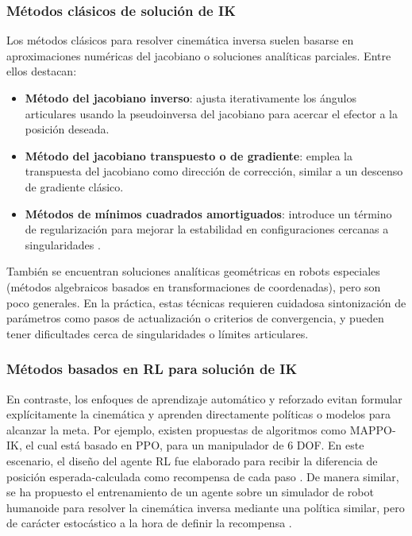 \subsubsection{Métodos clásicos de solución de IK}

Los métodos clásicos para resolver cinemática inversa suelen basarse en aproximaciones numéricas del jacobiano o soluciones analíticas parciales. Entre ellos destacan: 

\begin{itemize}
	\item \textbf{Método del jacobiano inverso}: ajusta iterativamente los ángulos articulares usando la pseudoinversa del jacobiano para acercar el efector a la posición deseada.
	
	\item \textbf{Método del jacobiano transpuesto o de gradiente}: emplea la transpuesta del jacobiano como dirección de corrección, similar a un descenso de gradiente clásico.
	
	\item \textbf{Métodos de mínimos cuadrados amortiguados}: introduce un término de regularización para mejorar la estabilidad en configuraciones cercanas a singularidades \parencite{zhao2024inverse}.
\end{itemize}


También se encuentran soluciones analíticas geométricas en robots especiales (métodos algebraicos basados en transformaciones de coordenadas), pero son poco generales. En la práctica, estas técnicas requieren cuidadosa sintonización de parámetros como pasos de actualización o criterios de convergencia, y pueden tener dificultades cerca de singularidades o límites articulares.\\

\subsubsection{Métodos basados en RL para solución de IK}

En contraste, los enfoques de aprendizaje automático y reforzado evitan formular explícitamente la cinemática y aprenden directamente políticas o modelos para alcanzar la meta. Por ejemplo, existen propuestas de algoritmos como MAPPO-IK, el cual está basado en PPO, para un manipulador de 6 DOF. En este escenario, el diseño del agente RL fue elaborado para recibir la diferencia de posición esperada-calculada como recompensa de cada paso \parencite{zhao2024inverse}. De manera similar, se ha propuesto el entrenamiento de un agente sobre un simulador de robot humanoide para resolver la cinemática inversa mediante una política similar, pero de carácter estocástico a la hora de definir la recompensa \parencite{adjei2024safe}.\\ 

